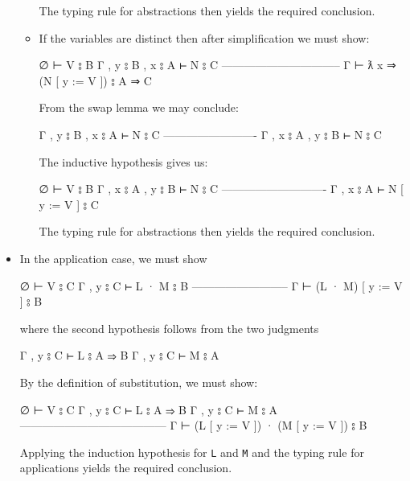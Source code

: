 \begin{itemize}
\begin{itemize}
    The typing rule for abstractions then yields the required
    conclusion.
  \item
    If the variables are distinct then after simplification we must
    show:

    \begin{myDisplay}
    ∅ ⊢ V ⦂ B
    Γ , y ⦂ B , x ⦂ A ⊢ N ⦂ C
    --------------------------------
    Γ ⊢ ƛ x ⇒ (N [ y := V ]) ⦂ A ⇒ C
    \end{myDisplay}

    From the swap lemma we may conclude:

    \begin{myDisplay}
    Γ , y ⦂ B , x ⦂ A ⊢ N ⦂ C
    -------------------------
    Γ , x ⦂ A , y ⦂ B ⊢ N ⦂ C
    \end{myDisplay}

    The inductive hypothesis gives us:

    \begin{myDisplay}
    ∅ ⊢ V ⦂ B
    Γ , x ⦂ A , y ⦂ B ⊢ N ⦂ C
    ----------------------------
    Γ , x ⦂ A ⊢ N [ y := V ] ⦂ C
    \end{myDisplay}

    The typing rule for abstractions then yields the required
    conclusion.
  \end{itemize}
\item
  In the application case, we must show

  \begin{myDisplay}
  ∅ ⊢ V ⦂ C
  Γ , y ⦂ C ⊢ L · M ⦂ B
  --------------------------
  Γ ⊢ (L · M) [ y := V ] ⦂ B
  \end{myDisplay}

  where the second hypothesis follows from the two judgments

  \begin{myDisplay}
  Γ , y ⦂ C ⊢ L ⦂ A ⇒ B
  Γ , y ⦂ C ⊢ M ⦂ A
  \end{myDisplay}

  By the definition of substitution, we must show:

  \begin{myDisplay}
  ∅ ⊢ V ⦂ C
  Γ , y ⦂ C ⊢ L ⦂ A ⇒ B
  Γ , y ⦂ C ⊢ M ⦂ A
  ---------------------------------------
  Γ ⊢ (L [ y := V ]) · (M [ y := V ]) ⦂ B
  \end{myDisplay}

  Applying the induction hypothesis for \texttt{L} and \texttt{M} and
  the typing rule for applications yields the required conclusion.
\end{itemize}

